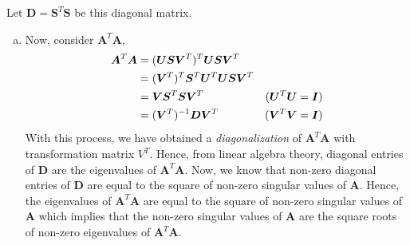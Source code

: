 \documentclass[a4paper,landscape]{article}
\begin{document}
Let $\bm{D}=\bm{S}^T\bm{S}$ be this diagonal matrix.
\begin{enumerate}[(a)]
	\item Now, consider $\bm{A}^T\bm{A}$, \label{itm:a}
	\begin{equation}\label{eq:AtA}
		\begin{aligned}
			\bm{A}^T\bm{A} &= (\bm{U}\bm{S}\bm{V}^T)^T \bm{U}\bm{S}\bm{V}^T\\
			&=  (\bm{V}^T)^T\bm{S}^T\bm{U}^T \bm{U}\bm{S}\bm{V}^T\\
			&=  \bm{V}\bm{S}^T\bm{S}\bm{V}^T &\hfill{(\bm{U}^T \bm{U} = \bm{I})}\\
			&=  (\bm{V}^T)^{-1}\bm{D}\bm{V}^T &\hfill{(\bm{V}^T \bm{V} = \bm{I})}\\
		\end{aligned}
	\end{equation}
	With this process, we have obtained a \emph{diagonalization} of $\bm{A}^T\bm{A}$ with transformation matrix $V^T$.
	Hence, from linear algebra theory, diagonal entries of $\bm{D}$ are the eigenvalues of $\bm{A}^T\bm{A}$.
	Now, we know that non-zero diagonal entries of $\bm{D}$ are equal to the square of non-zero singular values of $\bm{A}$. 
	Hence, the eigenvalues of $\bm{A}^T\bm{A}$ are equal to the square of non-zero singular values of $\bm{A}$ which implies that the non-zero singular values of $\bm{A}$ are the square roots of non-zero eigenvalues of $\bm{A}^T\bm{A}$.
	

\end{enumerate}
\end{document}
